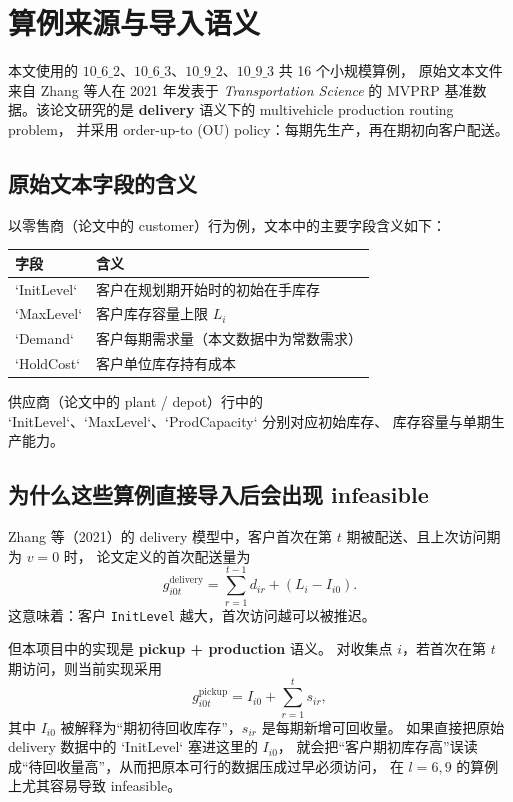 \documentclass{article}
\begin{document}
\section{算例来源与导入语义}

本文使用的 $10\_6\_2$、$10\_6\_3$、$10\_9\_2$、$10\_9\_3$ 共 16 个小规模算例，
原始文本文件来自 Zhang 等人在 2021 年发表于 \emph{Transportation Science}
的 MVPRP 基准数据。该论文研究的是 \textbf{delivery} 语义下的 multivehicle production routing problem，
并采用 order-up-to (OU) policy：每期先生产，再在期初向客户配送。

\subsection{原始文本字段的含义}

以零售商（论文中的 customer）行为例，文本中的主要字段含义如下：
\begin{center}
\begin{tabular}{ll}
\toprule
字段 & 含义 \\
\midrule
`InitLevel` & 客户在规划期开始时的初始在手库存 \\
`MaxLevel` & 客户库存容量上限 $L_i$ \\
`Demand` & 客户每期需求量（本文数据中为常数需求） \\
`HoldCost` & 客户单位库存持有成本 \\
\bottomrule
\end{tabular}
\end{center}

供应商（论文中的 plant / depot）行中的 `InitLevel`、`MaxLevel`、`ProdCapacity` 分别对应初始库存、
库存容量与单期生产能力。

\subsection{为什么这些算例直接导入后会出现 infeasible}

Zhang 等（2021）的 delivery 模型中，客户首次在第 $t$ 期被配送、且上次访问期为 $v=0$ 时，
论文定义的首次配送量为
\begin{equation}
g^{\text{delivery}}_{i0t}=\sum_{r=1}^{t-1} d_{ir} + (L_i - I_{i0}).
\end{equation}
这意味着：客户 \texttt{InitLevel} 越大，首次访问越可以被推迟。

但本项目中的实现是 \textbf{pickup + production} 语义。
对收集点 $i$，若首次在第 $t$ 期访问，则当前实现采用
\begin{equation}
g^{\text{pickup}}_{i0t}=I_{i0} + \sum_{r=1}^{t} s_{ir},
\end{equation}
其中 $I_{i0}$ 被解释为“期初待回收库存”，$s_{ir}$ 是每期新增可回收量。
如果直接把原始 delivery 数据中的 `InitLevel` 塞进这里的 $I_{i0}$，
就会把“客户期初库存高”误读成“待回收量高”，从而把原本可行的数据压成过早必须访问，
在 $l=6,9$ 的算例上尤其容易导致 infeasible。
\end{document}

